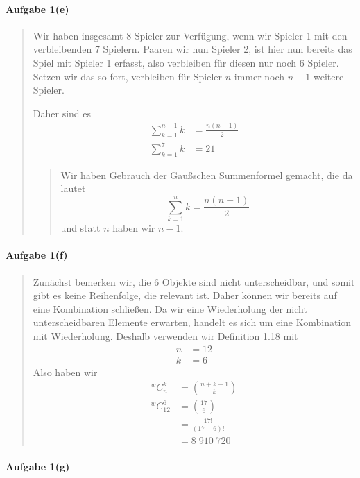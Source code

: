 \documentclass[
]{article}
\begin{document}
\paragraph{Aufgabe 1(e)}\label{aufgabe-1e}

\begin{quote}
Wir haben insgesamt 8 Spieler zur Verfügung, wenn wir Spieler 1 mit den
verbleibenden 7 Spielern. Paaren wir nun Spieler 2, ist hier nun bereits
das Spiel mit Spieler 1 erfasst, also verbleiben für diesen nur noch 6
Spieler. Setzen wir das so fort, verbleiben für Spieler \(n\) immer noch
\(n-1\) weitere Spieler.

Daher sind es \[\begin{align}
\sum_{k=1}^{n-1}k & = \frac{n(n-1)}{2}  \\
 \sum_{k=1}^7 k &= 21
\end{align}\]

\begin{quote}
Wir haben Gebrauch der Gaußschen Summenformel gemacht, die da lautet
\[\sum_{k=1}^n k = \frac{n(n+1)}{2}  \] und statt \(n\) haben wir
\(n-1\).
\end{quote}
\end{quote}

\paragraph{Aufgabe 1(f)}\label{aufgabe-1f}

\begin{quote}
Zunächst bemerken wir, die 6 Objekte sind nicht unterscheidbar, und
somit gibt es keine Reihenfolge, die relevant ist. Daher können wir
bereits auf eine Kombination schließen. Da wir eine Wiederholung der
nicht unterscheidbaren Elemente erwarten, handelt es sich um eine
Kombination mit Wiederholung. Deshalb verwenden wir Definition 1.18 mit
\[\begin{align}
n &= 12 \\
k &= 6  
\end{align}\] Also haben wir \[\begin{align}
^wC^k_{n} &= \binom{n+k-1}{k} \\
^wC^6_{12} &= \binom{17}{6}  \\
&= \frac{17!}{(17-6)!} \\
&= 8\;910\;720
\end{align}\]
\end{quote}

\paragraph{Aufgabe 1(g)}\label{aufgabe-1g}
\end{document}

